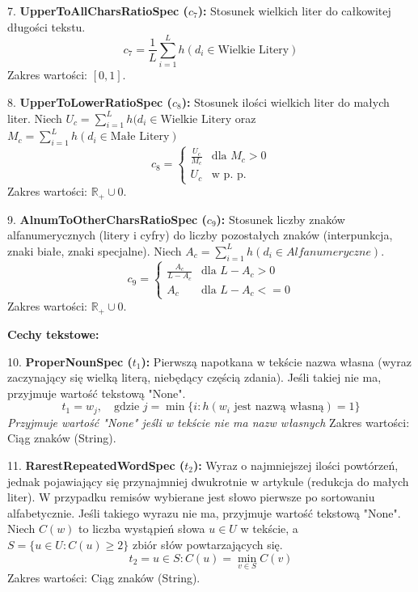 \documentclass{article}
\begin{document}
	7. \textbf{UpperToAllCharsRatioSpec (\(c_7\)):} Stosunek wielkich liter do całkowitej długości tekstu.
	\begin{equation}
		c_7 = \frac{1}{L} \sum_{i=1}^{L} h(d_i \in \text{Wielkie Litery})
	\end{equation}
	Zakres wartości: \([0, 1]\).
	
	8. \textbf{UpperToLowerRatioSpec (\(c_8\)):} Stosunek ilości wielkich liter do małych liter.
	Niech \(U_c = \sum_{i=1}^{L} h(d_i \in \text{Wielkie Litery}\) oraz \(M_c = \sum_{i=1}^{L} h(d_i \in \text{Małe Litery})\)
	\begin{equation}
		c_8 = \begin{cases}
			\frac{U_c}{M_c} & \text{dla } M_c > 0 \\
			U_c & \text{w p. p.}
		\end{cases}
	\end{equation}
	Zakres wartości: \(\mathbb{R}_{+} \cup 0\).
	
	9. \textbf{AlnumToOtherCharsRatioSpec (\(c_9\)):} Stosunek liczby znaków alfanumerycznych (litery i cyfry) do liczby pozostałych znaków (interpunkcja, znaki białe, znaki specjalne).
	Niech \(A_c = \sum_{i=1}^{L} h(d_i \in Alfanumeryczne)\).
	\begin{equation}
		c_9 = \begin{cases}
			\frac{A_c}{L - A_c} & \text{dla } L - A_c > 0 \\
			A_c & \text{dla } L - A_c <= 0
		\end{cases}
	\end{equation}
	Zakres wartości: \(\mathbb{R}_{+} \cup 0\).
	
	\textbf{Cechy tekstowe:}
	
	10. \textbf{ProperNounSpec (\(t_1\)):} Pierwszą napotkana w tekście nazwa własna (wyraz zaczynający się wielką literą, niebędący częścią zdania). Jeśli takiej nie ma, przyjmuje wartość tekstową "None".
	\begin{equation}
		t_1 = w_{j}, \quad \text{gdzie } j = \min \{ i : h(w_i \text{ jest nazwą własną}) = 1 \}
	\end{equation}
	\textit{Przyjmuje wartość "None" jeśli w tekście nie ma nazw własnych}
	Zakres wartości: Ciąg znaków (String).
	
	11. \textbf{RarestRepeatedWordSpec (\(t_2\)):} Wyraz o najmniejszej ilości powtórzeń, jednak pojawiający się przynajmniej dwukrotnie w artykule (redukcja do małych liter). W przypadku remisów wybierane jest słowo pierwsze po sortowaniu alfabetycznie. Jeśli takiego wyrazu nie ma, przyjmuje wartość tekstową "None".
	Niech \(C(w)\) to liczba wystąpień słowa \(u \in U\) w tekście, a \(S = \{u \in U : C(u) \ge 2\}\) zbiór słów powtarzających się.
	\begin{equation}
		t_2 = u \in S : C(u) = \min_{v \in S} C(v)
	\end{equation}
	Zakres wartości: Ciąg znaków (String).
	
\end{document}
